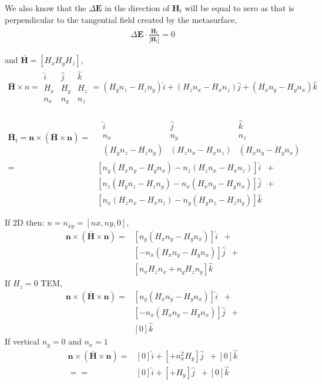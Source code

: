 \documentclass{article}
\newcommand{\E}{\mathbf{E}}
\renewcommand{\H}{\mathbf{H}}
\newcommand{\Hb}{\mathbf{\bar H}}
\newcommand{\n}{\mathbf{n}}
\newcommand{\DE}{\Delta \E}
\renewcommand{\H}{\mathbf{H}}
\newcommand{\0}{\varnothing}
\begin{document}
We also know that the $\DE$ in the direction of $\H_{t}$ will be equal to zero as that is perpendicular to the tangential field created by the metasurface,
\begin{align*}
\DE \cdot \frac{\Hb_t}{|\Hb_t|} = 0
\end{align*}

\newpage
and $\Hb = [H_x H_y H_z]$,
\begin{align*}
    \Hb \times n = 
    \begin{array}{|ccc|}
    \hat i & \hat j & \hat k\\
    H_x & H_y & H_z \\
        n_x & n_y & n_z     
    \end{array}
    = (H_y n_z - H_z n_y) \hat i + (H_z n_x - H_x n_z) \hat j + (H_x n_y - H_y n_x) \hat k
\end{align*}

\begin{align*}
    \Hb_t = \n \times (\Hb \times \n) = &\;\begin{array}{|ccc|}
    \hat i & \hat j & \hat k\\
    n_x & n_y & n_z     \\
    (H_y n_z - H_z n_y) & (H_z n_x - H_x n_z) & (H_x n_y - H_y n_x)
    \end{array}\\
     = &\left[n_y (H_x n_y - H_y n_x) - n_z (H_z n_x - H_x n_z) \right] \hat i \;\; + \\
       &\left[n_z (H_y n_z - H_z n_y) - n_x (H_x n_y - H_y n_x)\right] \hat j \;\; + \\
       &\left[n_x (H_z n_x - H_x n_z) - n_y (H_y n_z - H_z n_y) \right] \hat k
\end{align*}

If 2D then: $n = n_{xy} = [nx,ny,0]$,
\begin{align*}
    \n \times (\Hb \times \n) 
     = &\left[n_y (H_x n_y - H_y n_x) \right] \hat i \;\; + \\
       &\left[ - n_x (H_x n_y - H_y n_x)\right] \hat j \;\; + \\
       &\left[n_x H_z n_x + n_y  H_z n_y \right] \hat k
\end{align*}
If $H_z = 0$ TEM, 
\begin{align*}
    \n \times (\Hb \times \n) 
     = &\left[n_y (H_x n_y - H_y n_x) \right] \hat i \;\; + \\
       &\left[ - n_x (H_x n_y - H_y n_x)\right] \hat j \;\; + \\
       &\left[0 \right] \hat k
\end{align*}
If vertical $n_y = 0$ and $n_x = 1$
\begin{align*}
    \n \times (\Hb \times \n) 
     = &\left[0 \right] \hat i + 
       \left[ + n_x^2 H_y \right] \hat j \;\; + 
       \left[0 \right] \hat k\\
       == &\left[0 \right] \hat i + 
       \left[ +  H_y \right] \hat j \;\; + 
       \left[0 \right] \hat k\\    
\end{align*}
\end{document}
